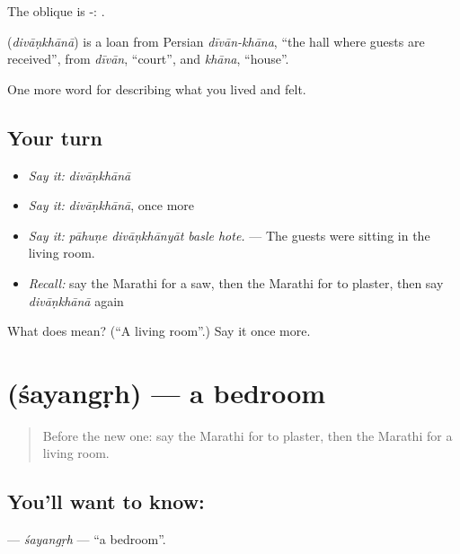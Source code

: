 The oblique is -: .

\begin{cousinweb}
\textbf{} (\emph{divāṇkhānā}) is a loan from Persian \emph{dīvān-khāna}, \textquotedblleft{}the hall where guests are received\textquotedblright{}, from \emph{dīvān}, \textquotedblleft{}court\textquotedblright{}, and \emph{khāna}, \textquotedblleft{}house\textquotedblright{}.
\end{cousinweb}

\begin{grammarlens}[title={What you've built}]
One more word for describing what you lived and felt.
\end{grammarlens}

\subsection*{Your turn}
\begin{itemize}
\raggedright
  \item \emph{Say it:} \emph{divāṇkhānā}
  \item \emph{Say it:} \emph{divāṇkhānā}, once more
  \item \emph{Say it:} \emph{pāhuṇe divāṇkhānyāt basle hote.} — The guests were sitting in the living room.
  \item \emph{Recall:} say the Marathi for a saw, then the Marathi for to plaster, then say \emph{divāṇkhānā} again
\end{itemize}

\begin{tcolorbox}[breakable,colback=teal!4,colframe=teal!35!black,title={Before you move on}]
What does  mean? (\textquotedblleft{}A living room\textquotedblright{}.) Say it once more.
\end{tcolorbox}
\section[\texorpdfstring{\mr{शयनगृह} (śayangṛh)}{शयनगृह (śayangṛh)}]{ (śayangṛh) — a bedroom}

\label{lesson:MR-C522-sayangrh}



\begin{quote}
Before the new one: say the Marathi for to plaster, then the Marathi for a living room.
\end{quote}

\subsection*{You'll want to know: }
\textbf{} — \emph{śayangṛh} — \textquotedblleft{}a bedroom\textquotedblright{}.

